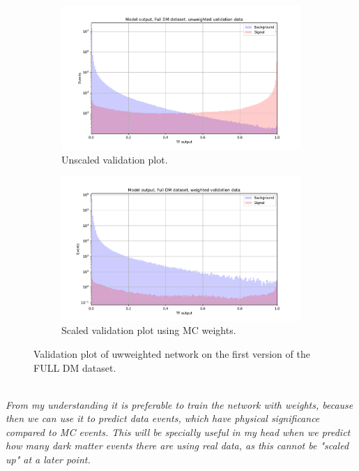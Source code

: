 \documentclass[14pt, a4paper]{book}
\begin{document}
\begin{figure}[!ht]
	\centering
	\begin{subfigure}[b]{0.8\textwidth}
        \centering
        \includegraphics[width=1\textwidth]{OLD_DM_FULL_VAL_UNW.pdf}
        \caption{Unscaled validation plot.}\label{fig:OLD_UNW_FULL_DM_VAL}
     \end{subfigure}
     \hfill
     \begin{subfigure}[b]{0.8\textwidth}
        \centering
        \includegraphics[width=1\textwidth]{OLD_DM_FULL_VAL_W.pdf}
        \caption{Scaled validation plot using MC weights.}\label{fig:OLD_W_FULL_DM_VAL}
     \end{subfigure}
	\caption{Validation plot of uwweighted network on the first version of the FULL DM dataset.}\label{fig:OLD_FULL_DM_VAL}
\end{figure}
\\\textit{From my understanding it is preferable to train the network with weights, because then we can use it to predict data events, which have physical significance compared to MC events. This will be specially useful in my head when we predict how many dark matter events there are using real data, as this cannot be "scaled up" at a later point.}\\
\end{document}
